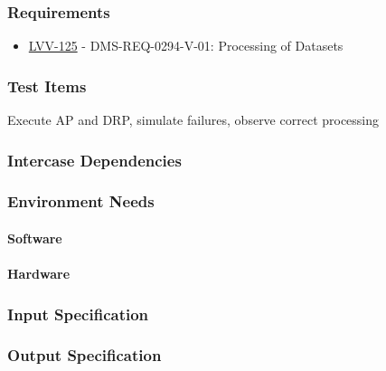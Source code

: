 \subsubsection{Requirements}
\begin{itemize}
\item \href{https://jira.lsstcorp.org/browse/LVV-125}{LVV-125} - DMS-REQ-0294-V-01: Processing of Datasets
\end{itemize}

\subsubsection{Test Items}
Execute AP and DRP, simulate failures, observe correct processing



\subsubsection{Intercase Dependencies}

\subsubsection{Environment Needs}

\paragraph{Software}

\paragraph{Hardware}

\subsubsection{Input Specification}

\subsubsection{Output Specification}


